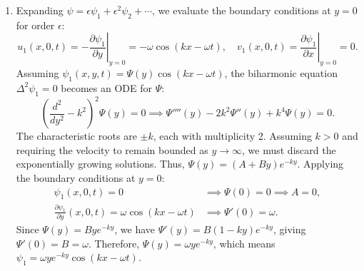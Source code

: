 \documentclass{article}
\begin{document}
\begin{enumerate}[label=\fbox{\arabic*}]
\begin{enumerate}[label=(\arabic*)]
          \item Expanding $\psi = \epsilon \psi_1 + \epsilon^2 \psi_2 + \cdots$, we evaluate the boundary conditions at $y = 0$ for order $\epsilon$:
          \[
            u_1(x, 0, t) = -\left. \frac{\partial \psi_1}{\partial y} \right|_{y=0} = -\omega \cos(kx - \omega t), \quad v_1(x, 0, t) = \left. \frac{\partial \psi_1}{\partial x} \right|_{y=0} = 0.
          \]
          Assuming $\psi_1(x, y, t) = \Psi(y) \cos(kx - \omega t)$, the biharmonic equation $\Delta^2 \psi_1 = 0$ becomes an ODE for $\Psi$:
          \[
            \left( \frac{d^2}{dy^2} - k^2 \right)^2 \Psi(y) = 0 \implies \Psi''''(y) - 2k^2 \Psi''(y) + k^4 \Psi(y) = 0.
          \]
          The characteristic roots are $\pm k$, each with multiplicity 2. Assuming $k > 0$ and requiring the velocity to remain bounded as $y \to \infty$, we must discard the exponentially growing solutions. Thus, $\Psi(y) = (A + By)e^{-ky}$.
          Applying the boundary conditions at $y=0$:
          \begin{align*}
            \psi_1(x, 0, t) = 0 &\implies \Psi(0) = 0 \implies A = 0, \\
            \frac{\partial \psi_1}{\partial y}(x, 0, t) = \omega \cos(kx - \omega t) &\implies \Psi'(0) = \omega.
          \end{align*}
          Since $\Psi(y) = By e^{-ky}$, we have $\Psi'(y) = B(1-ky)e^{-ky}$, giving $\Psi'(0) = B = \omega$.
          Therefore, $\Psi(y) = \omega y e^{-ky}$, which means $\psi_1 = \omega y e^{-ky} \cos(kx - \omega t)$.
          

\end{enumerate}
\end{enumerate}
\end{document}
